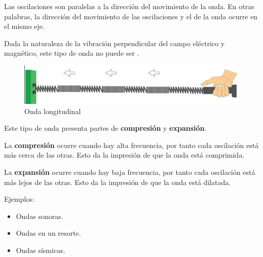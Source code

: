 Las oscilaciones son paralelas a la dirección del movimiento de la onda. En otras palabras, la dirección del movimiento de las oscilaciones y el de la onda ocurre en el mismo eje.

Dada la naturaleza de la vibración perpendicular del campo eléctrico y magnético, este tipo de onda no puede ser \electromagnetica.

\begin{figure}[H]
  \centering
  \includegraphics[scale=0.4]{imagenes/onda_longitudinal.png}
  \caption{Onda longitudinal\cite{educacao}}
\end{figure}

Este tipo de onda presenta partes de \textbf{compresión} y \textbf{expansión}.

La \textbf{compresión} ocurre cuando hay alta frecuencia, por tanto cada oscilación está más cerca de las otras. Esto da la impresión de que la onda está comprimida.

La \textbf{expansión} ocurre cuando hay baja frecuencia, por tanto cada oscilación está más lejos de las otras. Esto da la impresión de que la onda está dilatada.

Ejemplos:

\begin{itemize}
  \item Ondas sonoras.
  \item Ondas en un resorte.
  \item Ondas sísmicas.
\end{itemize}
